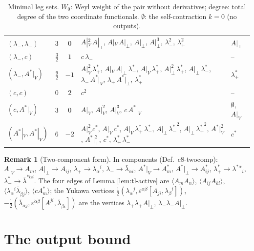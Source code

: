 \documentclass[11pt]{article}
\numberwithin{equation}{section}
\theoremstyle{plain}
\theoremstyle{definition}
\newtheorem{remark}[theorem]{Remark}
\begin{document}
\begin{table}[h]
\begin{tabular}{l|c|c|l|l}
$(\lambda_-,\lambda_-)$ & $3$ & $0$ & $A|_V^{2}\,A|_\perp$, $A|_V\,A|_\perp$, $A|_\perp$, $A|_\perp^{3}$, $\lambda_-^{2}$, $\lambda_+^{2}$ & $A|_\perp$\\
$(\lambda_-,c)$ & $\tfrac{3}{2}$ & $1$ & $c\,\lambda_-$ & --\\
$(\lambda_-,A^*|_V)$ & $\tfrac{9}{2}$ & $-1$ & $A|_V^{2}\,\lambda^*_+$, $A|_V\,A|_\perp\,\lambda^*_-$, $A|_V\,\lambda^*_+$, $A|_\perp^{2}\,\lambda^*_+$, $A|_\perp\,\lambda^*_-$, $\lambda_-\,A^*|_V$, $\lambda_+\,A^*|_\perp$, $\lambda^*_+$ & $\lambda^*_+$\\
$(c,c)$ & $0$ & $2$ & $c^{2}$ & --\\
$(c,A^*|_V)$ & $3$ & $0$ & $A|_V$, $A|_V^{2}$, $A|_V^{3}$, $c\,A^*|_V$ & $\emptyset$, $A|_V$\\
$(A^*|_V,A^*|_V)$ & $6$ & $-2$ & $A|_V^{2}\,c^*$, $A|_V\,c^*$, $A|_V\,\lambda^*_+\,\lambda^*_-$, $A|_\perp\,{\lambda^*_-}^{2}$, $A|_\perp\,{\lambda^*_+}^{2}$, $A^*|_V^{2}$, $A^*|_\perp^{2}$, $c^*$, $\lambda^*_+\,\lambda^*_-$ & $c^*$\\
\end{tabular}

\caption{Minimal leg sets. $W_0$: Weyl weight of the pair without derivatives; degree: total degree of the two coordinate functionals. $\emptyset$: the self-contraction $k=0$ (no outputs).}
\label{tab:tl-A}
\end{table}

\begin{remark}[Two-component form]
In components (Def.~c8-twocomp): $A|_V\to A_m$, $A|_\perp\to A_{ij}$, $\lambda_+\to\lambda_\alpha{}^i$, $\lambda_-\to\bar\lambda_{\dot\alpha i}$, $A^*|_V\to A^*_m$, $A^*|_\perp\to A^*_{ij}$, $\lambda^*_+\to\lambda^{*\alpha}{}_i$, $\lambda^*_-\to\bar\lambda^{*\dot\alpha i}$. The four edges of Lemma \ref{lem:tl-active} are $\langle A_mA_n\rangle$, $\langle A_{ij}A_{kl}\rangle$, $\langle\lambda_\alpha{}^i\bar\lambda_{\dot\beta j}\rangle$, $\langle cA^*_m\rangle$; the Yukawa vertices $\tfrac12(\lambda_\alpha{}^j,\varepsilon^{\alpha\beta}[A_{ji},\lambda_\beta{}^i])$, $-\tfrac12(\bar\lambda_{\dot\alpha j},\varepsilon^{\dot\alpha\dot\beta}[A^{ji},\bar\lambda_{\dot\beta i}])$ are the vertices $\lambda_+\lambda_+A|_\perp$, $\lambda_-\lambda_-A|_\perp$.
\end{remark}


\section{The output bound}
\label{sec:tl-bound}
\end{document}
